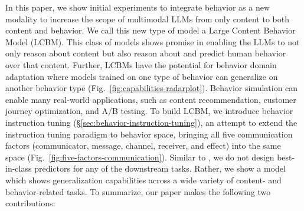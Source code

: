 



In this paper, we show initial experiments to integrate behavior as a new modality to increase the scope of multimodal LLMs from only content to both content and behavior. We call this new type of model a Large Content Behavior Model (LCBM). This class of models shows promise in enabling the LLMs to not only reason about content but also reason about and predict human behavior over that content. Further, LCBMs have the potential for behavior domain adaptation where models trained on one type of behavior can generalize on another behavior type (Fig.~\ref{fig:capabilities-radarplot}). Behavior simulation can enable many real-world applications, such as content recommendation, customer journey optimization, and A/B testing. To build LCBM, we introduce behavior instruction tuning (\S\ref{sec:behavior-instruction-tuning}), an attempt to extend the instruction tuning paradigm to behavior space, bringing all five communication factors (communicator, message, channel, receiver, and effect) into the same space (Fig.~\ref{fig:five-factors-communication}). Similar to \citet{brown2020language,raffel2020exploring,liu2023visual,ge2023planting}, we do not design best-in-class predictors for any of the downstream tasks. Rather, we show a model which shows generalization capabilities across a wide variety of content- and behavior-related tasks. To summarize, our paper makes the following two contributions:


